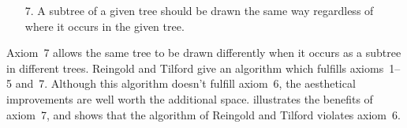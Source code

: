\begin{enumerate}                                                               
\item[7.] A subtree of a given tree should be                                   
          drawn the same way regardless of where it occurs in the given tree.   
\end{enumerate}                                                                 
                                                                                
Axiom~7 allows the same tree to be drawn differently when it occurs as          
a subtree in different trees.                                                   
Reingold and Tilford give an algorithm which fulfills axioms~1--5               
and~7. Although                                                                 
this algorithm doesn't fulfill axiom~6,      
the aesthetical improvements are well worth the additional space.
 illustrates the benefits of axiom~7, and 
shows that the algorithm of Reingold and Tilford violates axiom~6.

